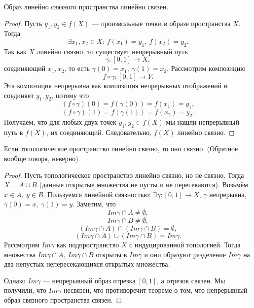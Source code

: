 \begin{statement}
    Образ линейно связного пространства линейно связен.
\end{statement}
\begin{proof}
    Пусть $y_1, y_2 \in f(X)$ — произвольные точки в образе пространства $X$. Тогда $$\exists x_1, x_2 \in X: \ f(x_1) = y_1, \ f(x_2) = y_2.$$
    Так как $X$ линейно связно, то существует непрерывный путь 
    \[\gamma: [0,1] \to X,\]
    соединяющий $x_1, x_2$, то есть $\gamma(0) = x_1, \ \gamma(1) = x_2$.
Рассмотрим композицию
\[f \circ \gamma: [0,1] \to Y.\]
Эта композиция непрерывна как композиция непрерывных отображений и соединяет $y_1, y_2$, потому что 
\[(f \circ \gamma)(0) = f(\gamma(0)) = f(x_1) = y_1,\]
\[(f \circ \gamma)(1) = f(\gamma(1)) = f(x_2) = y_2.\]
Получаем, что для любых двух точек $y_1, y_2 \in f(X)$ мы нашли непрерывный путь в $f(X)$, их соединяющий. Следовательно, $f(X)$ линейно связно.
\end{proof}

\begin{statement}
    Если топологическое пространство линейно связно, то оно связно. (Обратное, вообще говоря, неверно).
\end{statement}
\begin{proof}
    Пусть топологическое пространство линейно связно, но не связно. Тогда $X = A \cup B$ (данные открытые множества не пусты и не пересекаются). Возьмём $x \in A, \ y \in B$. Пользуемся линейной связностью: $\exists \gamma: [0, 1] \to X$, $\gamma$ непрерывна, $\gamma(0) = x, \ \gamma(1) = y$.
    Заметим, что $$Im \gamma \cap A \neq \emptyset,$$ 
    $$Im \gamma \cap B \neq \emptyset,$$
    $$(Im \gamma \cap A) \cap (Im \gamma \cap B) = \emptyset,$$
    $$(Im \gamma \cap A) \cup (Im \gamma \cap B) = Im \gamma.$$
    Рассмотрим $Im \gamma$ как подпространство $X$ с индуцированной топологией. Тогда множества $Im \gamma \cap A, \ Im \gamma \cap B$ открыты в $Im \gamma$ и они образуют разделение $Im \gamma$ на два непустых непересекающихся открытых множества.

    Однако $Im \gamma$ — непрерывный образ отрезка $[0,1]$, а отрезок связен. Мы получили, что $Im \gamma$ несвязен, что противоречит теореме о том, что непрерывный образ связного пространства связен.
\end{proof}

